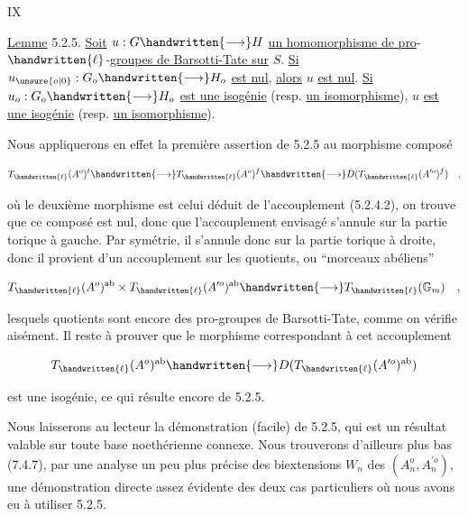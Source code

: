 \hfill IX

\uline{Lemme} 5.2.5. \uline{Soit} $u:G \handwritten{\longrightarrow} H$ \uline{un homomorphisme de pro}-$\handwritten{\ell}$-\uline{groupes de Barsotti-Tate sur} $S$. \uline{Si} $u_{\unsure{o|0}}:G_o \handwritten{\longrightarrow} H_o$ \uline{est nul}, \uline{alors} $u$ \uline{est nul}. \uline{Si} $u_o:G_o \handwritten{\longrightarrow} H_o$ \uline{est une isogénie} (resp. \uline{un isomorphisme}), $u$ \uline{est une isogénie} (resp. \uline{un isomorphisme}).

Nous appliquerons en effet la première assertion de 5.2.5 au morphisme composé

\[
T_{\handwritten{\ell}}(A^o)^t \handwritten{\longrightarrow} T_{\handwritten{\ell}}(A^o)^f \handwritten{\longrightarrow} D(T_{\handwritten{\ell}}(A^{\prime o})^f)\quad ,
\]

où le deuxième morphisme est celui déduit de l'accouplement (5.2.4.2), on trouve que ce composé est nul, donc que l'accouplement envisagé s'annule sur la partie torique à gauche. Par symétrie, il s'annule donc sur la partie torique à droite, donc il provient d'un accouplement sur les quotients, ou ``morceaux abéliens''

\[
T_{\handwritten{\ell}}(A^o)^{\mathrm{ab}}\times T_{\handwritten{\ell}}(A^{\prime o})^{\mathrm{ab}} \handwritten{\longrightarrow} T_{\handwritten{\ell}}(\mathbb{G}_m)\quad ,
\]

lesquels quotients sont encore des pro-groupes de Barsotti-Tate, comme on vérifie aisément. Il reste à prouver que le morphisme correspondant à cet accouplement

\[
T_{\handwritten{\ell}}(A^o)^{\mathrm{ab}} \handwritten{\longrightarrow} D(T_{\handwritten{\ell}}(A^{\prime o})^{\mathrm{ab}})
\]

est une isogénie, ce qui résulte  encore de 5.2.5.

Nous laisserons au lecteur la démonstration (facile) de 5.2.5, qui est un résultat valable sur toute base noethérienne connexe. Nous trouverons d'ailleurs plus bas (7.4.7), par une analyse un peu plus précise des biextensions $W_n$ des $(A^o_n,A^{\prime o}_n)$, une démonstration directe assez évidente des deux cas particuliers où nous avons eu à utiliser 5.2.5.


